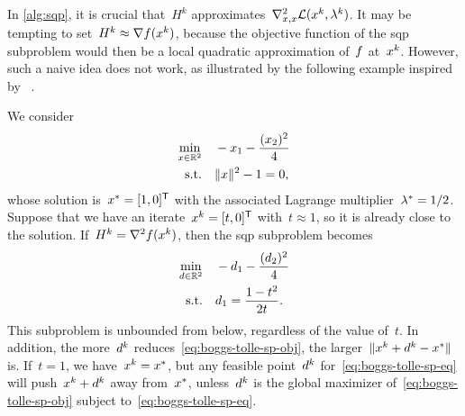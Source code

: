 In \cref{alg:sqp}, it is crucial that~$H^k$ approximates~$\nabla_{x, x}^2 \lag(\iter[k], \lm[k])$.
It may be tempting to set~$H^k \approx \nabla \obj(\iter[k])$, because the objective function of the \gls{sqp} subproblem would then be a local quadratic approximation of~$f$ at~$\iter[k]$.
However, such a naive idea does not work, as illustrated by the following example inspired by \citeauthor{Boggs_Tolle_1995}~\cite[\S~2.2]{Boggs_Tolle_1995}.

We consider
\begin{align*}
    \min_{\iter \in \R^2}   & \quad -\iter_1 - \frac{(\iter_2)^2}{4}\\
    \text{s.t.}             & \quad \norm{\iter}^2 - 1 = 0,
\end{align*}
whose solution is~$\iter[\ast] = [1, 0]^{\T}$ with the associated Lagrange multiplier~$\lm[\ast] = 1/2$.
Suppose that we have an iterate~$\iter[k] = [t, 0]^{\T}$ with~$t \approx 1$, so it is already close to the solution.
If~$H^k = \nabla^2 \obj(\iter[k])$, then the \gls{sqp} subproblem becomes
\begin{subequations}
    \begin{align}
        \min_{\step \in \R^2}   & \quad -\step_1 - \frac{(\step_2)^2}{4} \label{eq:boggs-tolle-sp-obj}\\
        \text{s.t.}             & \quad \step_1 = \frac{1 - t^2}{2 t}. \label{eq:boggs-tolle-sp-eq}
    \end{align}
\end{subequations}
This subproblem is unbounded from below, regardless of the value of~$t$.
In addition, the more~$\step[k]$ reduces~\cref{eq:boggs-tolle-sp-obj}, the larger~$\norm{\iter[k] + \step[k] - \iter[\ast]}$ is.
If~$t = 1$, we have~$\iter[k] = \iter[\ast]$, but any feasible point~$\step[k]$ for~\cref{eq:boggs-tolle-sp-eq} will push~$\iter[k] + \step[k]$ away from~$\iter[\ast]$, unless~$\step[k]$ is the global maximizer of~\cref{eq:boggs-tolle-sp-obj} subject to~\cref{eq:boggs-tolle-sp-eq}.


